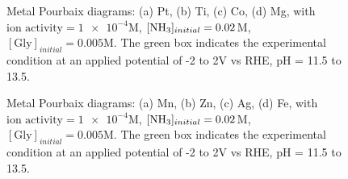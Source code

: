 \documentclass[journal=jacsat,manuscript=article]{achemso}
\begin{document}
\begin{figure}[htbp]
\centering
{}
\caption{Metal Pourbaix diagrams: (a) Pt, (b) Ti, (c) Co, (d) Mg, with $\text{ion activity}=\num{1e-4}$M, $[\ce{NH3}]_{initial}= 0.02$M, $[\text{Gly}]_{initial}=0.005$M. The green box indicates the experimental condition at an applied potential of -2 to 2V vs RHE, pH = 11.5 to 13.5.}
\label{fig:metal_pourbaix_collage_2}
\end{figure}

\begin{figure}[htbp]
\centering
{}
\caption{Metal Pourbaix diagrams: (a) Mn, (b) Zn, (c) Ag, (d) Fe, with $\text{ion activity}=\num{1e-4}$M, $[\ce{NH3}]_{initial}= 0.02$M, $[\text{Gly}]_{initial}=0.005$M. The green box indicates the experimental condition at an applied potential of -2 to 2V vs RHE, pH = 11.5 to 13.5.}
\label{fig:metal_pourbaix_collage_3}
\end{figure}
\end{document}
